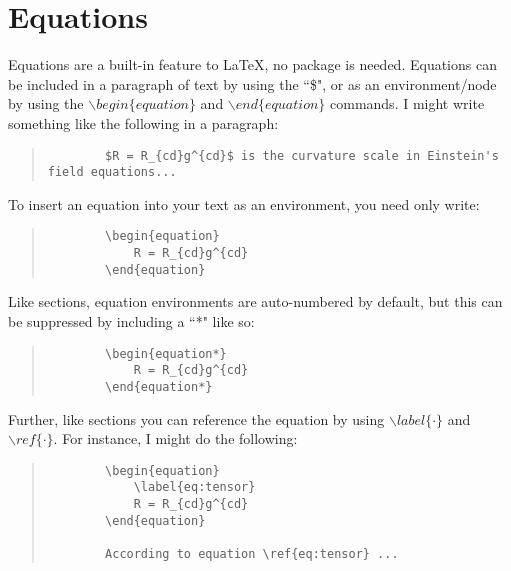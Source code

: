 \section{Equations}

Equations are a built-in feature to LaTeX, no package is needed. Equations can be included in a paragraph of text by using the ``\$", or as an environment/node by using the $\backslash begin\{equation\}$ and $\backslash end\{equation\}$ commands.  I might write something like the following in a paragraph:

\begin{quote}
	\begin{verbatim}
		$R = R_{cd}g^{cd}$ is the curvature scale in Einstein's field equations...
	\end{verbatim}
\end{quote}


To insert an equation into your text as an environment, you need only write:

\begin{quote}
	\begin{verbatim}
		\begin{equation}
			R = R_{cd}g^{cd}
		\end{equation}
	\end{verbatim}
\end{quote}

Like sections, equation environments are auto-numbered by default, but this can be suppressed by including a ``*" like so:

\begin{quote}
	\begin{verbatim}
		\begin{equation*}
			R = R_{cd}g^{cd}
		\end{equation*}
	\end{verbatim}
\end{quote}

Further, like sections you can reference the equation by using $\backslash label\{\cdot\}$ and $\backslash ref\{\cdot\}$.  For instance, I might do the following:

\begin{quote}
	\begin{verbatim}
		\begin{equation}
			\label{eq:tensor}	
			R = R_{cd}g^{cd}
		\end{equation}
		
		According to equation \ref{eq:tensor} ...
	\end{verbatim}
\end{quote}

